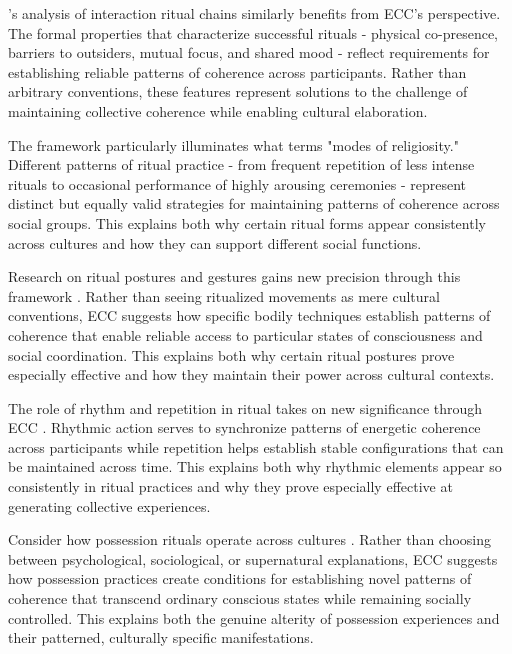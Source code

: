 \begin{refsection}
\cite{collins2004interaction}'s analysis of interaction ritual chains similarly benefits from ECC's perspective. The formal properties that characterize successful rituals - physical co-presence, barriers to outsiders, mutual focus, and shared mood - reflect requirements for establishing reliable patterns of coherence across participants. Rather than arbitrary conventions, these features represent solutions to the challenge of maintaining collective coherence while enabling cultural elaboration.

The framework particularly illuminates what \cite{whitehouse2004modes} terms "modes of religiosity." Different patterns of ritual practice - from frequent repetition of less intense rituals to occasional performance of highly arousing ceremonies - represent distinct but equally valid strategies for maintaining patterns of coherence across social groups. This explains both why certain ritual forms appear consistently across cultures and how they can support different social functions.

Research on ritual postures and gestures gains new precision through this framework \cite{kapferer1997feast}. Rather than seeing ritualized movements as mere cultural conventions, ECC suggests how specific bodily techniques establish patterns of coherence that enable reliable access to particular states of consciousness and social coordination. This explains both why certain ritual postures prove especially effective and how they maintain their power across cultural contexts.

The role of rhythm and repetition in ritual takes on new significance through ECC \cite{mcneill1995keeping}. Rhythmic action serves to synchronize patterns of energetic coherence across participants while repetition helps establish stable configurations that can be maintained across time. This explains both why rhythmic elements appear so consistently in ritual practices and why they prove especially effective at generating collective experiences.

Consider how possession rituals operate across cultures \cite{houseman1998naven}. Rather than choosing between psychological, sociological, or supernatural explanations, ECC suggests how possession practices create conditions for establishing novel patterns of coherence that transcend ordinary conscious states while remaining socially controlled. This explains both the genuine alterity of possession experiences and their patterned, culturally specific manifestations.


\end{refsection}
